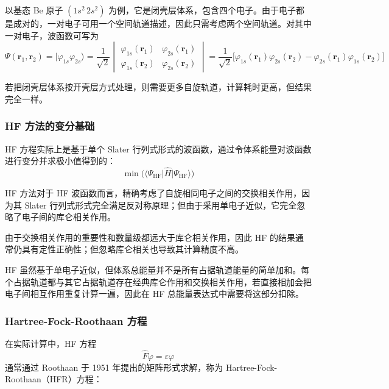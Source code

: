 以基态 Be 原子 $\left(1s^2\,2s^2\right)$ 为例，它是闭壳层体系，包含四个电子。由于电子都是成对的，一对电子可用一个空间轨道描述，因此只需考虑两个空间轨道。对其中一对电子，波函数可写为
\[
\Psi(\mathbf r_1,\mathbf r_2)
=
\lvert \varphi_{1s}\varphi_{2s}\rangle
=
\frac{1}{\sqrt{2}}
\begin{vmatrix}
\varphi_{1s}(\mathbf r_1) & \varphi_{2s}(\mathbf r_1) \\
\varphi_{1s}(\mathbf r_2) & \varphi_{2s}(\mathbf r_2)
\end{vmatrix}
=
\frac{1}{\sqrt{2}}
\bigl[
\varphi_{1s}(\mathbf r_1)\varphi_{2s}(\mathbf r_2)
-\varphi_{2s}(\mathbf r_1)\varphi_{1s}(\mathbf r_2)
\bigr]
\]

若把闭壳层体系按开壳层方式处理，则需要更多自旋轨道，计算耗时更高，但结果完全一样。

\subsubsection*{HF 方法的变分基础}

HF 方程实际上是基于单个 Slater 行列式形式的波函数，通过令体系能量对波函数进行变分并求极小值得到的：
\[
\min \bigl(\langle \Psi_{\mathrm{HF}}\lvert \hat H \rvert \Psi_{\mathrm{HF}}\rangle\bigr)
\]

HF 方法对于 HF 波函数而言，精确考虑了自旋相同电子之间的交换相关作用，因为其 Slater 行列式形式完全满足反对称原理；但由于采用单电子近似，它完全忽略了电子间的库仑相关作用。

由于交换相关作用的重要性和数量级都远大于库仑相关作用，因此 HF 的结果通常仍具有定性正确性；但忽略库仑相关也导致其计算精度不高。

HF 虽然基于单电子近似，但体系总能量并不是所有占据轨道能量的简单加和。每个占据轨道都与其它占据轨道存在经典库仑作用和交换相关作用，若直接相加会把电子间相互作用重复计算一遍，因此在 HF 总能量表达式中需要将这部分扣除。

\subsubsection*{Hartree-Fock-Roothaan 方程}

在实际计算中，HF 方程
\[
\hat F\varphi=\varepsilon\varphi
\]
通常通过 Roothaan 于 1951 年提出的矩阵形式求解，称为 Hartree-Fock-Roothaan（HFR）方程：

\begin{center}
\setlength{\fboxsep}{10pt}
\end{center}

